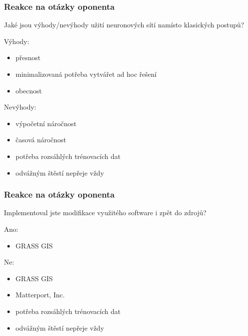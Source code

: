 \documentclass{beamer}
\begin{document}
\begin{frame}

\frametitle{Reakce na otázky oponenta}

Jaké jsou výhody/nevýhody užití neuronových sítí namísto klasických postupů?

\begin{center}
	\noindent\makebox[\linewidth]{\rule{0.9\textwidth}{0.4pt}}
\end{center}

\bigskip

Výhody:
\begin{itemize}
	\item<2-> přesnost
	\item<3-> minimalizovaná potřeba vytvářet ad hoc řešení
	\item<4-> obecnost
\end{itemize}

Nevýhody:
\begin{itemize}
	\item<5-> výpočetní náročnost
	\item<6-> časová náročnost
	\item<7-> potřeba rozsáhlých trénovacích dat
	\item<8-> odvážným štěstí nepřeje vždy
\end{itemize}

\end{frame}


\begin{frame}

\frametitle{Reakce na otázky oponenta}

Implementoval jste modifikace využitého software i zpět do zdrojů?

\begin{center}
	\noindent\makebox[\linewidth]{\rule{0.9\textwidth}{0.4pt}}
\end{center}

\bigskip

Ano:
\begin{itemize}
	\item<2-> GRASS GIS
\end{itemize}

Ne:
\begin{itemize}
	\item<3-> GRASS GIS
	\item<4-> Matterport, Inc.
	\item<7-> potřeba rozsáhlých trénovacích dat
	\item<8-> odvážným štěstí nepřeje vždy
\end{itemize}

\end{frame}
\end{document}
